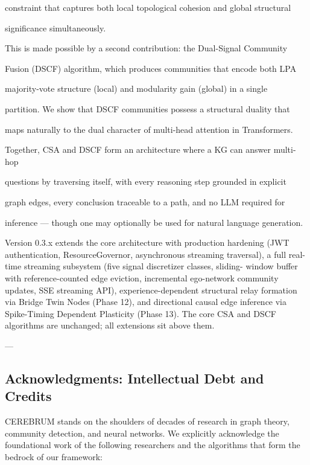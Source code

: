 \documentclass[10pt,journal,compsoc]{IEEEtran}
\begin{document}
constraint that captures both local topological cohesion and global structural

signi\-ficance simul\-taneously.

This is made possible by a second contr\-ibution: the \textit{}Dual-Signal Community

Fusion (DSCF)\textit{} algorithm, which produces communities that encode both LPA

majority-vote structure (local) and modularity gain (global) in a single

partition. We show that DSCF communities possess a structural duality that

maps naturally to the dual character of multi-head attention in Transf\-ormers.

Together, CSA and DSCF form an archi\-tecture where a KG can answer multi-hop

questions by traversing itself, with every reasoning step grounded in explicit

graph edges, every conclusion traceable to a path, and no LLM required for

inference — though one may optionally be used for natural language generation.

Version 0.3.x extends the core archi\-tecture with production hardening (JWT
authe\-ntication, ResourceGovernor, async\-hronous streaming traversal), a
full real-time streaming subsystem (five signal discretizer classes, sliding-
window buffer with reference-counted edge eviction, incremental ego-network
community updates, SSE streaming API), experience-dependent structural relay
formation via Bridge Twin Nodes (Phase 12), and directional causal edge
inference via Spike-Timing Dependent Plasticity (Phase 13). The core CSA and
DSCF algorithms are unchanged; all extensions sit above them.

---

\subsection{Acknow\-ledgments: Intell\-ectual Debt and Credits}

CEREBRUM stands on the shoulders of decades of research in graph theory, community detection, and neural networks. We explicitly acknowledge the found\-ational work of the following researchers and the algorithms that form the bedrock of our framework:
\end{document}
